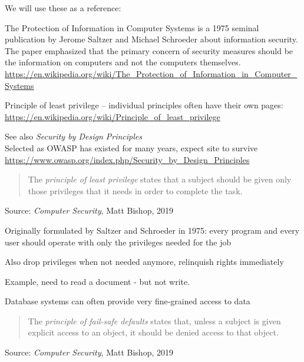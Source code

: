 \documentclass[Screen16to9,17pt]{foils}
\begin{document}

We will use these as a reference:
\begin{list2}
\item The Protection of Information in Computer Systems is a 1975 seminal publication by Jerome Saltzer and Michael Schroeder about information security. The paper emphasized that the primary concern of security measures should be the information on computers and not the computers themselves.\\
\url{https://en.wikipedia.org/wiki/The_Protection_of_Information_in_Computer_Systems}
\item Principle of least privilege -- individual principles often have their own pages:\\
\url{https://en.wikipedia.org/wiki/Principle_of_least_privilege}
\item See also \emph{Security by Design Principles}\\
Selected as OWASP has existed for many years, expect site to survive\\
\url{https://www.owasp.org/index.php/Security_by_Design_Principles}
\end{list2}





\begin{quote}
The \emph{principle of least privilege} states that a subject should be given only those privileges that it needs in order to complete the task.
\end{quote}
Source: \emph{Computer Security}, Matt Bishop, 2019

\begin{list2}
\item Originally formulated by Saltzer and Schroeder in 1975: every program and every user should operate with only the privileges needed for the job
\item Also drop privileges when not needed anymore, relinquish rights immediately
\item Example, need to read a document - but not write.
\item Database systems can often provide very fine-grained access to data
\end{list2}


\begin{quote}
The \emph{principle of fail-safe defaults} states that, unless a subject is given explicit access to an object, it should be denied access to that object.
\end{quote}
Source: \emph{Computer Security}, Matt Bishop, 2019
\end{document}
